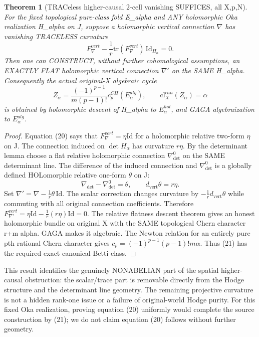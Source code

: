 \documentclass[11pt]{article}
\newtheorem{theorem}{Theorem}
\begin{document}
\begin{theorem}[TRACeless higher-causal 2-cell vanishing SUFFICES, all X,p,N]
For the fixed topological pure-class
fold E_alpha and ANY holomorphic
Oka realization H_alpha on J,
suppose a holomorphic vertical
connection $\nabla$ has
vanishing TRACELESS curvature
\[
 \boxed{
  F_\nabla^{vert}
    -\frac1r\mathrm{tr}(F_\nabla^{vert})
                  \,\mathrm{Id}_{H_\alpha}
       =0.
 }                                                       \tag{20}
\]
Then one can CONSTRUCT, without
further cohomological assumptions,
an EXACTLY FLAT holomorphic
vertical connection $\nabla'$ on
the SAME H_alpha. Consequently
the actual original-X algebraic
cycle
\[
 \boxed{
 Z_\alpha=
 \frac{(-1)^{p-1}}{m(p-1)!}
          c_p^{CH}(E_\alpha^{alg}),
 \qquad
 \mathrm{cl}^{can}_X(Z_\alpha)=\alpha
 }                                                       \tag{21}
\]
is obtained by holomorphic
descent of H_alpha to
$E_\alpha^{hol}$, and GAGA
algebraization to $E_\alpha^{alg}$.
\end{theorem}
\begin{proof}
Equation (20) says that
$F_\nabla^{vert}=\eta\mathrm{Id}$
for a holomorphic relative
two-form $\eta$ on J.
The connection induced on
$\det H_\alpha$ has curvature
$r\eta$. By the determinant
lemma choose a flat relative
holomorphic connection
$\nabla_{\det}^0$ on
the SAME determinant line.
The difference of the induced
connection and $\nabla_{\det}^0$
is a globally defined HOLomorphic
relative one-form $\theta$ on J:
\[
 \nabla_{\det}-\nabla_{\det}^0
      =\theta,\qquad
 d_{\mathrm{vert}}\theta=r\eta.
\]
Set
$\nabla'=\nabla-\frac1r\theta\,\mathrm{Id}$.
The scalar correction changes
curvature by
$-\frac1r d_{\mathrm{vert}}\theta$
while commuting with all
original connection coefficients.
Therefore
$F_{\nabla'}^{vert}
 =\eta\mathrm{Id}-
 \frac1r(r\eta)\mathrm{Id}=0$.
The relative flatness descent
theorem gives an honest
holomorphic bundle on original
X with the SAME topological
Chern character r+m alpha.
GAGA makes it algebraic.
The Newton relation for an
entirely pure pth rational
Chern character gives
$c_p=(-1)^{p-1}(p-1)!m\alpha$.
Thus (21) has the required
exact canonical Betti class.
\end{proof}

This result identifies the
genuinely NONABELIAN part
of the spatial higher-causal
obstruction: the scalar/trace
part is removable directly
from the Hodge structure and
the determinant line geometry.
The remaining projective
curvature is not a hidden
rank-one issue or a failure
of original-world Hodge purity.
For this fixed Oka realization,
proving equation (20)
uniformly would complete the
source construction by (21);
we do not claim equation
(20) follows without further
geometry.
\end{document}
